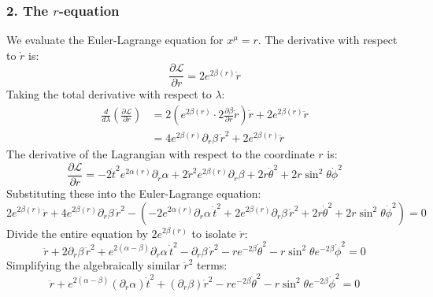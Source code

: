 \documentclass[11pt, a4paper]{report}
\begin{document}
\subsubsection*{2. The $r$-equation}

We evaluate the Euler-Lagrange equation for $x^\mu = r$. 
The derivative with respect to $\dot{r}$ is:
\begin{equation}
    \frac{\partial \mathcal{L}}{\partial \dot{r}} = 2e^{2\beta(r)} \dot{r}
\end{equation}
Taking the total derivative with respect to $\lambda$:
\begin{align}
    \frac{d}{d\lambda} \left( \frac{\partial \mathcal{L}}{\partial \dot{r}} \right) &= 2 \left( e^{2\beta(r)} \cdot 2 \frac{\partial \beta}{\partial r} \dot{r} \right) \dot{r} + 2e^{2\beta(r)} \ddot{r} \nonumber \\
    &= 4e^{2\beta(r)} \partial_r \beta \, \dot{r}^2 + 2e^{2\beta(r)} \ddot{r}
\end{align}
The derivative of the Lagrangian with respect to the coordinate $r$ is:
\begin{equation}
    \frac{\partial \mathcal{L}}{\partial r} = -2\dot{t}^2 e^{2\alpha(r)} \partial_r \alpha + 2\dot{r}^2 e^{2\beta(r)} \partial_r \beta + 2r\dot{\theta}^2 + 2r\sin^2\theta \dot{\phi}^2
\end{equation}
Substituting these into the Euler-Lagrange equation:
\begin{equation}
    2e^{2\beta(r)} \ddot{r} + 4e^{2\beta(r)} \partial_r \beta \, \dot{r}^2 - \left( -2e^{2\alpha(r)} \partial_r \alpha \, \dot{t}^2 + 2e^{2\beta(r)} \partial_r \beta \, \dot{r}^2 + 2r\dot{\theta}^2 + 2r\sin^2\theta \dot{\phi}^2 \right) = 0
\end{equation}
Divide the entire equation by $2e^{2\beta(r)}$ to isolate $\ddot{r}$:
\begin{equation}
    \ddot{r} + 2\partial_r \beta \, \dot{r}^2 + e^{2(\alpha - \beta)} \partial_r \alpha \, \dot{t}^2 - \partial_r \beta \, \dot{r}^2 - r e^{-2\beta} \dot{\theta}^2 - r \sin^2\theta e^{-2\beta} \dot{\phi}^2 = 0
\end{equation}
Simplifying the algebraically similar $\dot{r}^2$ terms:
\begin{equation}
    \ddot{r} + e^{2(\alpha - \beta)} (\partial_r \alpha) \dot{t}^2 + (\partial_r \beta) \dot{r}^2 - r e^{-2\beta} \dot{\theta}^2 - r \sin^2\theta e^{-2\beta} \dot{\phi}^2 = 0 \label{eq:geo_r}
\end{equation}
\end{document}
